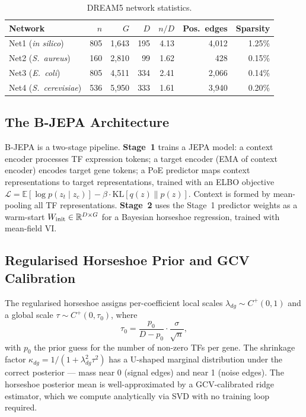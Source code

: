 \documentclass[11pt]{article}
\begin{document}
\begin{table}[h]
\centering
\caption{DREAM5 network statistics.}
\label{tab:networks}
\begin{tabular}{lrrrrrr}
\toprule
Network & $n$ & $G$ & $D$ & $n/D$ & Pos.\ edges & Sparsity \\
\midrule
Net1 (\textit{in silico})     & 805 & 1{,}643 & 195 & 4.13 & 4{,}012 & 1.25\% \\
Net2 (\textit{S.~aureus})     & 160 & 2{,}810 &  99 & 1.62 &    428  & 0.15\% \\
Net3 (\textit{E.~coli})       & 805 & 4{,}511 & 334 & 2.41 & 2{,}066 & 0.14\% \\
Net4 (\textit{S.~cerevisiae}) & 536 & 5{,}950 & 333 & 1.61 & 3{,}940 & 0.20\% \\
\bottomrule
\end{tabular}
\end{table}

\subsection{The B-JEPA Architecture}

B-JEPA \citep{huang2026} is a two-stage pipeline.
\textbf{Stage~1} trains a JEPA model: a context encoder processes TF expression
tokens; a target encoder (EMA of context encoder) encodes target gene tokens;
a PoE predictor maps context representations to target representations, trained
with an ELBO objective $\mathcal{L} = \mathbb{E}[\log p(z_t \mid z_c)] - \beta
\cdot \mathrm{KL}[q(z) \| p(z)]$.
Context is formed by mean-pooling all TF representations.
\textbf{Stage~2} uses the Stage~1 predictor weights as a warm-start
$W_{\rm init} \in \mathbb{R}^{D \times G}$ for a Bayesian horseshoe regression,
trained with mean-field VI.

\subsection{Regularised Horseshoe Prior and GCV Calibration}

The regularised horseshoe \citep{piironen2017} assigns per-coefficient local
scales $\lambda_{dg} \sim C^+(0,1)$ and a global scale $\tau \sim C^+(0,\tau_0)$,
where
\begin{equation}
  \tau_0 = \frac{p_0}{D - p_0} \cdot \frac{\sigma}{\sqrt{n}},
  \label{eq:tau0}
\end{equation}
with $p_0$ the prior guess for the number of non-zero TFs per gene.
The shrinkage factor $\kappa_{dg} = 1/(1 + \lambda_{dg}^2\tau^2)$ has a
U-shaped marginal distribution under the correct posterior --- mass near 0
(signal edges) and near 1 (noise edges).
The horseshoe posterior mean is well-approximated by a GCV-calibrated ridge
estimator, which we compute analytically via SVD with no training loop required.
\end{document}
